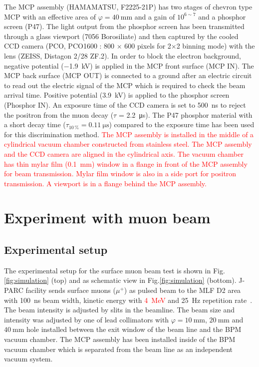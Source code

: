 \documentclass[preprint,3p,twocolumn]{elsarticle}
\begin{document}
The MCP assembly (HAMAMATSU, F2225-21P) has two stages of chevron type MCP with an effective area of $\varphi=\SI{40}{\mm}$ and a gain of $10^{6\sim7}$ and a phosphor screen (P47). The light output from the phosphor screen has been transmitted through a glass viewport (7056 Borosiliate) and then captured by the cooled CCD camera (PCO, PCO1600 : 800 $\times$ 600 pixels for 2$\times$2 binning mode) with the lens (ZEISS, Distagon 2/28 ZF.2). 
In order to block the electron background, negative potential (\SI{-1.9}{\kilo\volt}) is applied in the MCP front surface (MCP IN).
The MCP back surface (MCP OUT) is connected to a ground after an electric circuit to read out the electric signal of the MCP which is required to check the beam arrival time.
Positive potential (\SI{3.9}{\kilo\volt}) is applied to the phosphor screen (Phosphor IN).
An exposure time of the CCD camera is set to \SI{500}{\nano\s} to reject the positron from the muon decay ($\tau$ = \SI{2.2}{\micro\s}).
The P47 phosphor material with a short decay time ($\tau_{\SI{10}{\percent}}=\SI{0.11}{\micro\s}$) compared to the exposure time has been used for this discrimination method.
\textcolor{red}{The MCP assembly is installed in the middle of a cylindrical vacuum chamber constructed from stainless steel.
The MCP assembly and the CCD camera are aligned in the cylindrical axis.
The vacuum chamber has thin mylar film (\SI{0.1}{mm}) window in a flange in front of the MCP assembly for beam transmission.
Mylar film window is also in a side port for positron transmission. 
A viewport is in a flange behind the MCP assembly.}

\section{Experiment with muon beam}

\subsection{Experimental setup} 

The experimental setup for the surface muon beam test is shown in Fig.\ref{fig:simulation} {(top)} and as schematic view in Fig.\ref{fig:simulation} {(bottom)}.
J-PARC facility sends surface muons ($\mu^{+}$) as pulsed beam to the MLF D2 area with \SI{100}{\nano\s} beam width, kinetic energy with \textcolor{red}{\SI{4}{\MeV}} and \SI{25}{\hertz} repetition rate~\cite{D-line, D-line1}.
The beam intensity is adjusted by slits in the beamline.
The beam size and intensity was adjusted by one of lead collimators with $\varphi=\SI{10}{\mm}$, $\SI{20}{\mm}$ and $\SI{40}{\mm}$ hole installed between the exit window of the beam line and the BPM vacuum chamber.
The MCP assembly has been installed inside of the BPM vacuum chamber which is separated from the beam line as an independent vacuum system.
\end{document}
